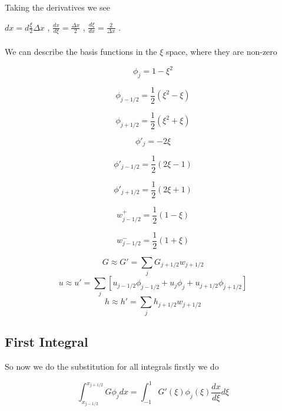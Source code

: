 \documentclass[12pt]{article}
\begin{document}
Taking the derivatives we see


$dx = d\frac{\xi}{2}\Delta x$ , $\frac{dx}{d\xi} = \frac{\Delta x}{2}$ , $\frac{d\xi}{dx} = \frac{2}{\Delta x}$ . \\ \\ We can describe the basis functions in the $\xi$ space, where they are non-zero

\begin{equation}
\phi_{j} = 1 - \xi^2
\end{equation}

\begin{equation}
\phi_{j - 1/2} = \frac{1}{2}\left(\xi^2 - \xi\right)
\end{equation}

\begin{equation}
\phi_{j + 1/2} = \frac{1}{2}\left(\xi^2 + \xi\right)
\end{equation}

\begin{equation}
\phi'_{j} =  - 2\xi
\end{equation}

\begin{equation}
\phi'_{j - 1/2} = \frac{1}{2}\left(2\xi - 1\right)
\end{equation}

\begin{equation}
\phi'_{j + 1/2} = \frac{1}{2}\left(2\xi + 1\right)
\end{equation}

\begin{equation}
w^+_{j - 1/2} = \frac{1}{2}\left(1 - \xi\right)
\end{equation}

\begin{equation}
w^-_{j - 1/2} = \frac{1}{2}\left(1 + \xi\right)
\end{equation}

\[G \approx G' = \sum_{j}G_{j+1/2}w_{j+1/2}\]
\[u \approx u' = \sum_{j} \left[u_{j-1/2}\phi_{j-1/2} + u_{j}\phi_{j} + u_{j+1/2}\phi_{j+1/2}\right] \]
\[h \approx h' = \sum_{j}h_{j+1/2}w_{j+1/2}\]

\subsection{First Integral}
So now we do the substitution for all integrals firstly we do

\[\int_{x_{j-1/2}}^{x_{j+1/2}} G\phi_{j} dx = \int_{-1}^{1} G'(\xi)\phi_{j}(\xi) \frac{d x}{d\xi}d\xi\]
\end{document}
